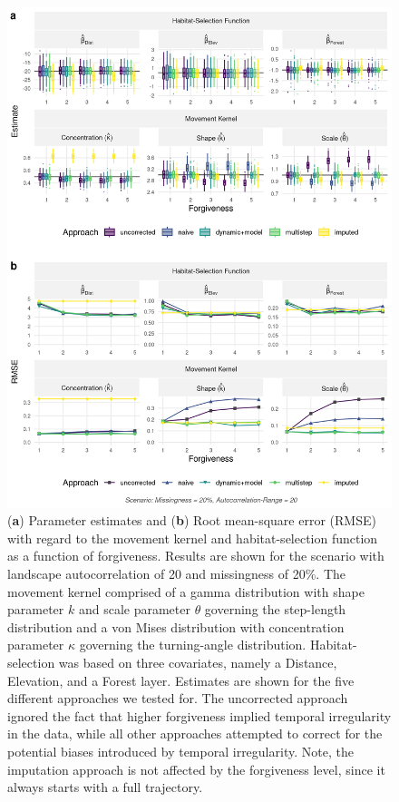 \documentclass[abstract=on,10pt,a4paper,bibliography=totocnumbered]{article}
\begin{document}
\begin{figure}
  \begin{center}
  \includegraphics[width = \textwidth]{99_ModelComparisonForgiveness.png}
  \caption{(\textbf{a}) Parameter estimates and (\textbf{b}) Root mean-square
  error (RMSE) with regard to the movement kernel and habitat-selection function
  as a function of forgiveness. Results are shown for the scenario with
  landscape autocorrelation of 20 and missingness of 20\%. The movement kernel
  comprised of a gamma distribution with shape parameter $k$ and scale parameter
  $\theta$ governing the step-length distribution and a von Mises distribution
  with concentration parameter $\kappa$ governing the turning-angle
  distribution. Habitat-selection was based on three covariates, namely a
  \textsf{Distance}, \textsf{Elevation}, and a \textsf{Forest} layer. Estimates
  are shown for the five different approaches we tested for. The uncorrected
  approach ignored the fact that higher forgiveness implied temporal
  irregularity in the data, while all other approaches attempted to correct for
  the potential biases introduced by temporal irregularity. Note, the imputation
  approach is not affected by the forgiveness level, since it always starts with
  a full trajectory.}
  \label{ModelComparisonForgiveness}
  \end{center}
\end{figure}
\end{document}
